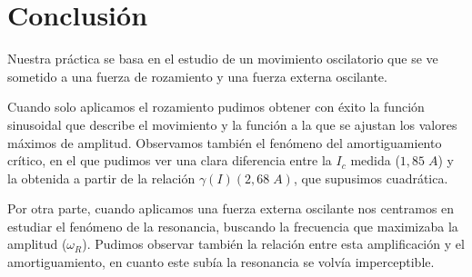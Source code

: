 \documentclass[a4paper,12pt,titlepage]{article}
\begin{document}
\section{Conclusión}

Nuestra práctica se basa en el estudio de un movimiento oscilatorio que se ve sometido a una fuerza de rozamiento y una fuerza externa oscilante.

\par Cuando solo aplicamos el rozamiento pudimos obtener con éxito la función sinusoidal que describe el movimiento y la función a la que se ajustan los valores máximos de amplitud. Observamos también el fenómeno del amortiguamiento crítico, en el que pudimos ver una clara diferencia entre la $I_c$ medida ($1,85\;A$) y la obtenida a partir de la relación $\gamma(I) (2,68 \;A)$, que supusimos cuadrática.
\par Por otra parte, cuando aplicamos una fuerza externa oscilante nos centramos en estudiar el fenómeno de la resonancia, buscando la frecuencia que maximizaba la amplitud ($\omega_R$). Pudimos observar también la relación entre esta amplificación y el amortiguamiento, en cuanto este subía la resonancia se volvía imperceptible.
\end{document}
